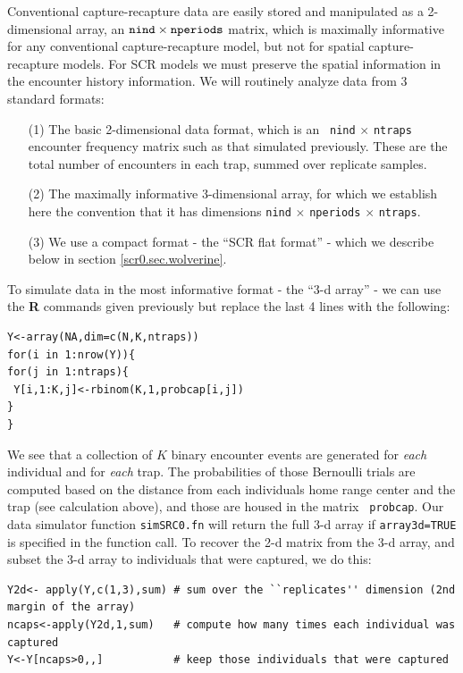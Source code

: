 Conventional capture-recapture data are easily stored and manipulated
as a 2-dimensional array, an $\mbox{\tt nind} \times \mbox{\tt
  nperiods}$ matrix, which is maximally informative for any
conventional capture-recapture model, but not for spatial
capture-recapture models.  For SCR models we must preserve the spatial
information in the encounter history information. We will routinely
analyze data from 3 standard formats:
\begin{itemize}
\item[(1)] The basic 2-dimensional data format, which is an \mbox{\tt
    nind} $\times$ \mbox{\tt ntraps} encounter frequency matrix such
  as that simulated previously. These are the total number of encounters in each
  trap, summed over replicate samples.
\item[(2)] The maximally informative 3-dimensional array, for which we
  establish here the convention that it has dimensions \mbox{\tt nind}
  $\times$ \mbox{\tt nperiods} $\times$ \mbox{\tt ntraps}.\item[(3)] We use a compact format - the ``SCR flat format'' - which
  we describe below in section \ref{scr0.sec.wolverine}.
\end{itemize}
To simulate data in the most informative format - the ``3-d array'' -
we can use the {\bf R} commands given previously but replace the last
4 lines with the following:
{\small
\begin{verbatim}
Y<-array(NA,dim=c(N,K,ntraps))
for(i in 1:nrow(Y)){
for(j in 1:ntraps){
 Y[i,1:K,j]<-rbinom(K,1,probcap[i,j])
}
}
\end{verbatim}
} 

We see that a collection of $K$ binary encounter events are
generated for {\it each} individual and for {\it each} trap.  The
probabilities of those Bernoulli trials are computed based on the
distance from each individuals home range center and the trap (see
calculation above), and those are housed in the matrix \mbox{\tt
  probcap}. Our data simulator function \mbox{\tt simSRC0.fn} will
return the full 3-d array if \mbox{\tt array3d=TRUE} is specified in
the function call.  To recover the 2-d matrix from the 3-d array, and
subset the 3-d array to individuals that were captured, we do this:
{\small
\begin{verbatim}
Y2d<- apply(Y,c(1,3),sum) # sum over the ``replicates'' dimension (2nd margin of the array)
ncaps<-apply(Y2d,1,sum)   # compute how many times each individual was captured
Y<-Y[ncaps>0,,]           # keep those individuals that were captured
\end{verbatim}
}

